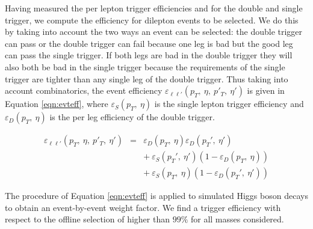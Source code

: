 Having measured the per lepton trigger efficiencies 
and for the double and single trigger,
we compute the efficiency for dilepton events to be selected.
We do this by taking into account the two ways an event can be selected: 
the double trigger can pass or the double trigger can fail because one leg is bad
but the good leg can pass the single trigger.
If both legs are bad in the double trigger they will also both be bad in the single trigger
because the requirements of the single trigger are tighter than any single leg of the double trigger.
Thus taking into account combinatorics, the event efficiency $\varepsilon_{\ell\ell'}(p_T,\:\eta,\:p'_T,\:\eta')$
is given in Equation \ref{eqn:evteff}, where $\varepsilon_{S}(p_T,\:\eta)$ is the single 
lepton trigger efficiency and
$\varepsilon_{D}(p_T,\:\eta)$ is the per leg efficiency of the double trigger.

\begin{eqnarray}
\label{eqn:evteff}
\varepsilon_{\ell\ell'}(p_T,\:\eta,\:p'_T,\:\eta') & = & \varepsilon_{D}(p_T,\:\eta) \varepsilon_{D}(p_T',\:\eta') \nonumber\\
               &   & +~\varepsilon_{S}(p_T',\:\eta')(1-\varepsilon_{D}(p_T,\:\eta)) \nonumber\\
               &   & +~\varepsilon_{S}(p_T,\:\eta)(1-\varepsilon_{D}(p_T',\:\eta'))
\end{eqnarray}

The procedure of Equation \ref{eqn:evteff} is applied to simulated Higgs boson decays to obtain an event-by-event weight factor. 
We find a trigger efficiency with respect to the offline selection of higher than $99\%$ for all masses considered.%

